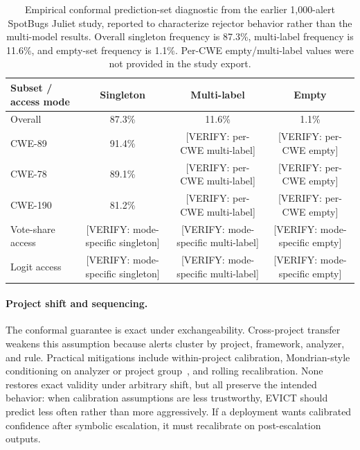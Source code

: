 \begin{table}[t]
\centering
\caption{Empirical conformal prediction-set diagnostic from the earlier 1,000-alert SpotBugs Juliet study, reported to characterize rejector behavior rather than the multi-model results. Overall singleton frequency is 87.3\%, multi-label frequency is 11.6\%, and empty-set frequency is 1.1\%. Per-CWE empty/multi-label values were not provided in the study export.}
\label{tab:coverage_diagnostic}
\small
\begin{tabular}{lccc}
\toprule
\textbf{Subset / access mode} & \textbf{Singleton} & \textbf{Multi-label} & \textbf{Empty} \\
\midrule
Overall & 87.3\% & 11.6\% & 1.1\% \\
CWE-89 & 91.4\% & [VERIFY: per-CWE multi-label] & [VERIFY: per-CWE empty] \\
CWE-78 & 89.1\% & [VERIFY: per-CWE multi-label] & [VERIFY: per-CWE empty] \\
CWE-190 & 81.2\% & [VERIFY: per-CWE multi-label] & [VERIFY: per-CWE empty] \\
Vote-share access & [VERIFY: mode-specific singleton] & [VERIFY: mode-specific multi-label] & [VERIFY: mode-specific empty] \\
Logit access & [VERIFY: mode-specific singleton] & [VERIFY: mode-specific multi-label] & [VERIFY: mode-specific empty] \\
\bottomrule
\end{tabular}
\end{table}

\paragraph{Project shift and sequencing.}
The conformal guarantee is exact under exchangeability. Cross-project transfer weakens this assumption because alerts cluster by project, framework, analyzer, and rule. Practical mitigations include within-project calibration, Mondrian-style conditioning on analyzer or project group~\cite{romano2020}, and rolling recalibration. None restores exact validity under arbitrary shift, but all preserve the intended behavior: when calibration assumptions are less trustworthy, EVICT should predict less often rather than more aggressively. If a deployment wants calibrated confidence after symbolic escalation, it must recalibrate on post-escalation outputs.
